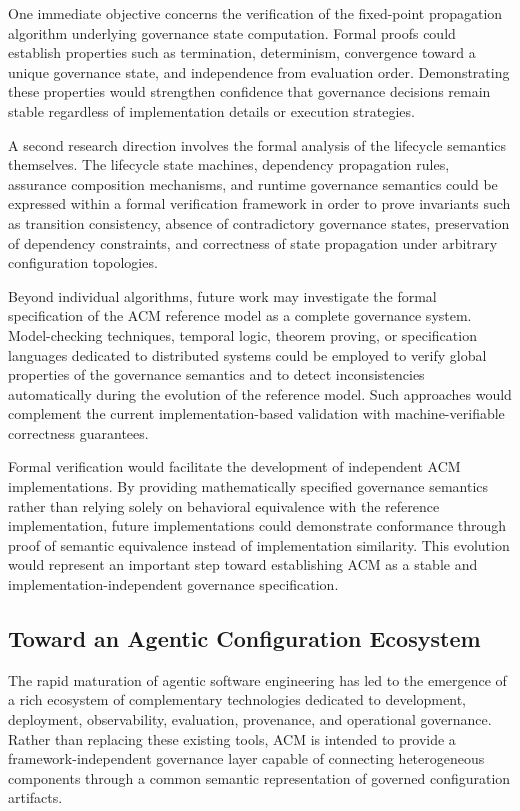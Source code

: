 \documentclass[10pt]{article}
\begin{document}
One immediate objective concerns the verification of the fixed-point propagation algorithm underlying governance state computation. Formal proofs could establish properties such as termination, determinism, convergence toward a unique governance state, and independence from evaluation order. Demonstrating these properties would strengthen confidence that governance decisions remain stable regardless of implementation details or execution strategies.

A second research direction involves the formal analysis of the lifecycle semantics themselves. The lifecycle state machines, dependency propagation rules, assurance composition mechanisms, and runtime governance semantics could be expressed within a formal verification framework in order to prove invariants such as transition consistency, absence of contradictory governance states, preservation of dependency constraints, and correctness of state propagation under arbitrary configuration topologies.

Beyond individual algorithms, future work may investigate the formal specification of the ACM reference model as a complete governance system. Model-checking techniques, temporal logic, theorem proving, or specification languages dedicated to distributed systems could be employed to verify global properties of the governance semantics and to detect inconsistencies automatically during the evolution of the reference model. Such approaches would complement the current implementation-based validation with machine-verifiable correctness guarantees.

Formal verification would facilitate the development of independent ACM implementations. By providing mathematically specified governance semantics rather than relying solely on behavioral equivalence with the reference implementation, future implementations could demonstrate conformance through proof of semantic equivalence instead of implementation similarity. This evolution would represent an important step toward establishing ACM as a stable and implementation-independent governance specification.

\subsection{Toward an Agentic Configuration Ecosystem}
\label{sec:future_ecosystem}

The rapid maturation of agentic software engineering has led to the emergence of a rich ecosystem of complementary technologies dedicated to development, deployment, observability, evaluation, provenance, and operational governance. Rather than replacing these existing tools, ACM is intended to provide a framework-independent governance layer capable of connecting heterogeneous components through a common semantic representation of governed configuration artifacts.
\end{document}
